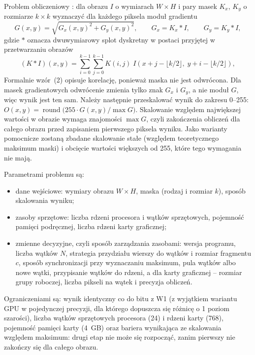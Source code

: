 \documentclass[12pt,a4paper]{article}
\begin{document}
Problem obliczeniowy \cite{gonzalez,tadeusiewicz}: dla obrazu $I$ o wymiarach $W \times H$ i pary masek $K_x$, $K_y$ o rozmiarze $k \times k$ wyznaczyć dla każdego piksela moduł gradientu
\begin{equation}
	G(x, y) = \sqrt{G_x(x, y)^{2} + G_y(x, y)^{2}}, \qquad G_x = K_x * I, \qquad G_y = K_y * I,
	\label{eq:gradient}
\end{equation}
gdzie $*$ oznacza dwuwymiarowy splot dyskretny w postaci przyjętej w przetwarzaniu obrazów \cite{gonzalez}
\begin{equation}
	(K * I)(x, y) = \sum_{i=0}^{k-1} \sum_{j=0}^{k-1} K(i, j)\; I\!\left(x + j - \lfloor k/2 \rfloor,\; y + i - \lfloor k/2 \rfloor\right),
\end{equation}
Formalnie wzór~(2) opisuje korelację, ponieważ maska nie jest odwrócona. Dla masek gradientowych odwrócenie zmienia tylko znak $G_x$ i $G_y$, a nie moduł $G$, więc wynik jest ten sam. Należy następnie przeskalować wynik do zakresu 0--255: $O(x, y) = \operatorname{round}\big(255 \cdot G(x, y) / \max G\big)$. Skalowanie względem największej wartości w obrazie wymaga znajomości $\max G$, czyli zakończenia obliczeń dla całego obrazu przed zapisaniem pierwszego piksela wyniku. Jako warianty pomocnicze zostaną zbadane skalowanie stałe (względem teoretycznego maksimum maski) i obcięcie wartości większych od 255, które tego wymagania nie mają.

Parametrami problemu są:
\begin{itemize}
	\item dane wejściowe: wymiary obrazu $W \times H$, maska (rodzaj i rozmiar $k$), sposób skalowania wyniku;
	\item zasoby sprzętowe: liczba rdzeni procesora i wątków sprzętowych, pojemność pamięci podręcznej, liczba rdzeni karty graficznej;
	\item zmienne decyzyjne, czyli sposób zarządzania zasobami: wersja programu, liczba wątków $N$, strategia przydziału wierszy do wątków i rozmiar fragmentu $c$, sposób synchronizacji przy wyznaczaniu maksimum, pula wątków albo nowe wątki, przypisanie wątków do rdzeni, a dla karty graficznej -- rozmiar grupy roboczej, liczba pikseli na wątek i precyzja obliczeń.
\end{itemize}
Ograniczeniami są: wynik identyczny co do bitu z W1 (z wyjątkiem wariantu GPU w pojedynczej precyzji, dla którego dopuszcza się różnicę o 1 poziom szarości), liczba wątków sprzętowych procesora (24) i rdzeni karty (768), pojemność pamięci karty (4~GB) oraz bariera wynikająca ze skalowania względem maksimum: drugi etap nie może się rozpocząć, zanim pierwszy nie zakończy się dla całego obrazu.
\end{document}
